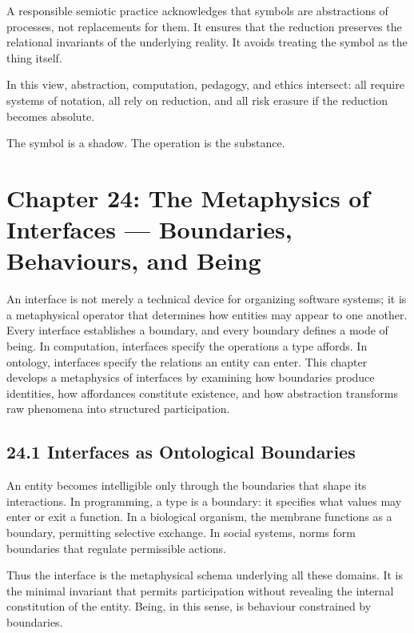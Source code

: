 \documentclass[12pt,letterpaper]{article}
\theoremstyle{remark}
\begin{document}
A responsible semiotic practice acknowledges that symbols are abstractions of processes, not replacements for them. It ensures that the reduction preserves the relational invariants of the underlying reality. It avoids treating the symbol as the thing itself.

In this view, abstraction, computation, pedagogy, and ethics intersect: all require systems of notation, all rely on reduction, and all risk erasure if the reduction becomes absolute.

The symbol is a shadow. The operation is the substance.

\newpage
\section{Chapter 24: The Metaphysics of Interfaces — Boundaries, Behaviours, and Being}

An interface is not merely a technical device for organizing software systems; it is a metaphysical operator that determines how entities may appear to one another. Every interface establishes a boundary, and every boundary defines a mode of being. In computation, interfaces specify the operations a type affords. In ontology, interfaces specify the relations an entity can enter. This chapter develops a metaphysics of interfaces by examining how boundaries produce identities, how affordances constitute existence, and how abstraction transforms raw phenomena into structured participation.

\subsection{24.1 Interfaces as Ontological Boundaries}

An entity becomes intelligible only through the boundaries that shape its interactions. In programming, a type is a boundary: it specifies what values may enter or exit a function. In a biological organism, the membrane functions as a boundary, permitting selective exchange. In social systems, norms form boundaries that regulate permissible actions.

Thus the interface is the metaphysical schema underlying all these domains. It is the minimal invariant that permits participation without revealing the internal constitution of the entity. Being, in this sense, is behaviour constrained by boundaries.
\end{document}

